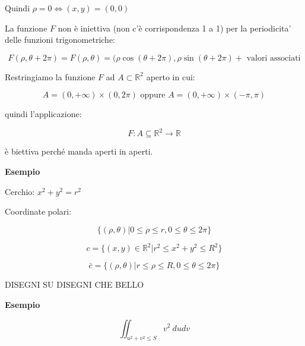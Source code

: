 \documentclass[../appunti-analisi.tex]{subfiles}
\begin{document}
Quindi $\rho=0 \Leftrightarrow (x,y) = (0,0)$

La funzione $F$ non è iniettiva (non c'è corrispondenza 1 a 1) per la periodicita' delle funzioni trigonometriche:

\[
    F(\rho, \theta + 2\pi) = F(\rho,\theta) = (\rho \cos (\theta+ 2\pi), \rho \sin (\theta + 2\pi) + \text{ valori associati}
\]

Restringiamo la funzione $F$ ad $A \subset \mathbb{R}^{2}$ aperto in cui:

\[
    A = (0, +\infty) \times (0, 2\pi) \text{ oppure } A=(0, +\infty) \times (-\pi, \pi)
\]

quindi l'applicazione:

\[
    F: A \subseteq \mathbb{R}^{2} \rightarrow \mathbb{R}
\]

è biettiva perché manda aperti in aperti.

\newpage


\textbf{Esempio} 

Cerchio: $x^{2}+y^{2}=r^{2}$

Coordinate polari:

\[
    \{(\rho,\theta) | 0 \le \rho \le r, 0 \le \theta \le  2\pi\}
\]

\[
    c = \{(x,y) \in \mathbb{R}^{2}| r^{2} \le x^{2}+y^{2} \le R^{2}\}
\]

\[
    \bar{c} = \{(\rho,\theta) | r \le \rho \le R, 0 \le \theta \le 2\pi\}
\]

DISEGNI SU DISEGNI CHE BELLO


\textbf{Esempio} 

\[
    \iint_{u^{2}+v^{2} \le S} {v^{2}} \: dudv 
\]
\end{document}

